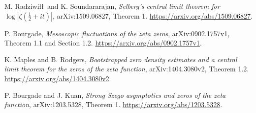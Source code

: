 M. Radziwi\l\l\ and K. Soundararajan,
\emph{Selberg's central limit theorem for $\log|\zeta(\tfrac12+it)|$},
arXiv:1509.06827, Theorem 1.
\url{https://arxiv.org/abs/1509.06827}.

P. Bourgade, \emph{Mesoscopic fluctuations of the zeta zeros},
arXiv:0902.1757v1, Theorem 1.1 and Section 1.2.
\url{https://arxiv.org/abs/0902.1757v1}.

K. Maples and B. Rodgers,
\emph{Bootstrapped zero density estimates and a central limit theorem
for the zeros of the zeta function},
arXiv:1404.3080v2, Theorem 1.2.
\url{https://arxiv.org/abs/1404.3080v2}.

P. Bourgade and J. Kuan,
\emph{Strong Szego asymptotics and zeros of the zeta function},
arXiv:1203.5328, Theorem 1.
\url{https://arxiv.org/abs/1203.5328}.
